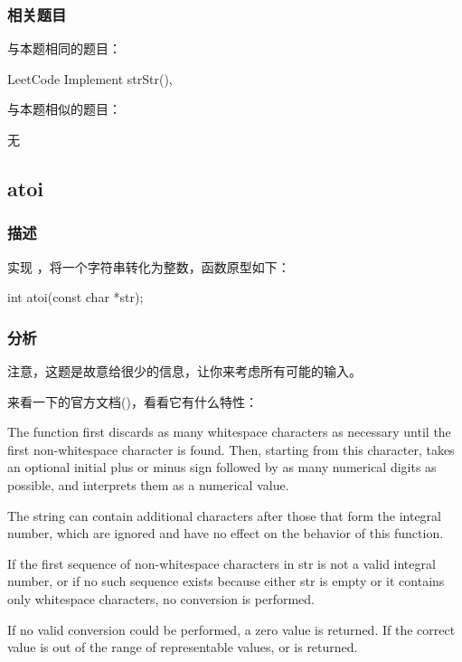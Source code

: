 \subsubsection{相关题目}
与本题相同的题目：
\begindot
\item LeetCode Implement strStr(), 
\myenddot

与本题相似的题目：
\begindot
\item  无
\myenddot


\subsection{atoi}
\label{sec:string-to-integer}


\subsubsection{描述}
实现 ，将一个字符串转化为整数，函数原型如下：
\begin{Code}
int atoi(const char *str);
\end{Code}


\subsubsection{分析}
注意，这题是故意给很少的信息，让你来考虑所有可能的输入。

来看一下的官方文档()，看看它有什么特性：

The function first discards as many whitespace characters as necessary until the first non-whitespace character is found. Then, starting from this character, takes an optional initial plus or minus sign followed by as many numerical digits as possible, and interprets them as a numerical value.

The string can contain additional characters after those that form the integral number, which are ignored and have no effect on the behavior of this function.

If the first sequence of non-whitespace characters in str is not a valid integral number, or if no such sequence exists because either str is empty or it contains only whitespace characters, no conversion is performed.

If no valid conversion could be performed, a zero value is returned. If the correct value is out of the range of representable values,  or  is returned.


